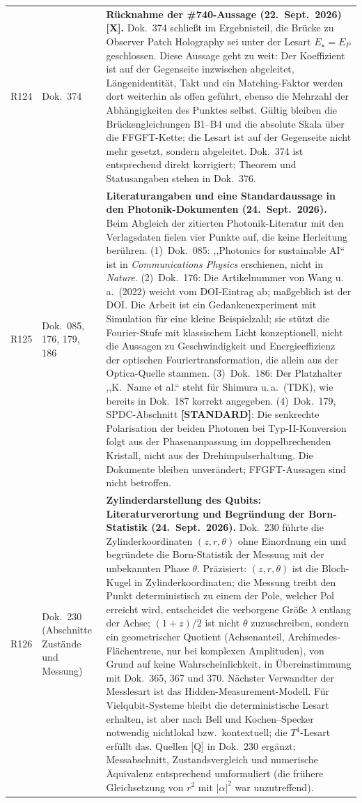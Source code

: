 \begin{longtable}{@{}p{0.9cm}p{3.1cm}p{10.2cm}@{}}
R124 & Dok.~374 & \textbf{Rücknahme der \#740-Aussage (22.~Sept.~2026) [X].} Dok.~374 schließt im Ergebnisteil, die Brücke zu Observer Patch Holography sei unter der Lesart $E_\star=E_P$ geschlossen. Diese Aussage geht zu weit: Der Koeffizient ist auf der Gegenseite inzwischen abgeleitet, Längenidentität, Takt und ein Matching-Faktor werden dort weiterhin als offen geführt, ebenso die Mehrzahl der Abhängigkeiten des Punktes selbst. Gültig bleiben die Brückengleichungen B1--B4 und die absolute Skala über die FFGFT-Kette; die Lesart ist auf der Gegenseite nicht mehr gesetzt, sondern abgeleitet. Dok.~374 ist entsprechend direkt korrigiert; Theorem und Statusangaben stehen in Dok.~376. \\
R125 & Dok.~085, 176, 179, 186 & \textbf{Literaturangaben und eine Standardaussage in den Photonik-Dokumenten (24.~Sept.~2026).} Beim Abgleich der zitierten Photonik-Literatur mit den Verlagsdaten fielen vier Punkte auf, die keine Herleitung berühren. (1)~Dok.~085: ,,Photonics for sustainable AI`` ist in \emph{Communications Physics} erschienen, nicht in \emph{Nature}. (2)~Dok.~176: Die Artikelnummer von Wang u.\,a.\ (2022) weicht vom DOI-Eintrag ab; maßgeblich ist der DOI. Die Arbeit ist ein Gedankenexperiment mit Simulation für eine kleine Beispielzahl; sie stützt die Fourier-Stufe mit klassischem Licht konzeptionell, nicht die Aussagen zu Geschwindigkeit und Energieeffizienz der optischen Fouriertransformation, die allein aus der Optica-Quelle stammen. (3)~Dok.~186: Der Platzhalter ,,K.~Name et al.`` steht für Shimura u.\,a.\ (TDK), wie bereits in Dok.~187 korrekt angegeben. (4)~Dok.~179, SPDC-Abschnitt \textbf{[STANDARD]}: Die senkrechte Polarisation der beiden Photonen bei Typ-II-Konversion folgt aus der Phasenanpassung im doppelbrechenden Kristall, nicht aus der Drehimpulserhaltung. Die Dokumente bleiben unverändert; FFGFT-Aussagen sind nicht betroffen. \\
R126 & Dok.~230 (Abschnitte Zustände und Messung) & \textbf{Zylinderdarstellung des Qubits: Literaturverortung und Begründung der Born-Statistik (24.~Sept.~2026).} Dok.~230 führte die Zylinderkoordinaten $(z,r,\theta)$ ohne Einordnung ein und begründete die Born-Statistik der Messung mit der unbekannten Phase $\theta$. Präzisiert: $(z,r,\theta)$ ist die Bloch-Kugel in Zylinderkoordinaten; die Messung treibt den Punkt deterministisch zu einem der Pole, welcher Pol erreicht wird, entscheidet die verborgene Größe $\lambda$ entlang der Achse; $(1+z)/2$ ist nicht $\theta$ zuzuschreiben, sondern ein geometrischer Quotient (Achsenanteil, Archimedes-Flächentreue, nur bei komplexen Amplituden), von Grund auf keine Wahrscheinlichkeit, in Übereinstimmung mit Dok.~365, 367 und 370. Nächster Verwandter der Messlesart ist das Hidden-Measurement-Modell. Für Vielqubit-Systeme bleibt die deterministische Lesart erhalten, ist aber nach Bell und Kochen--Specker notwendig nichtlokal bzw.\ kontextuell; die $T^4$-Lesart erfüllt das. Quellen [Q] in Dok.~230 ergänzt; Messabschnitt, Zustandsvergleich und numerische Äquivalenz entsprechend umformuliert (die frühere Gleichsetzung von $r^2$ mit $|\alpha|^2$ war unzutreffend). \\

\end{longtable}
